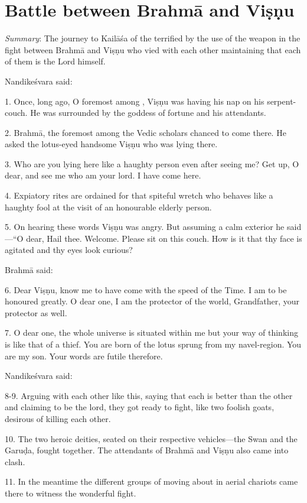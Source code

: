 \chapter{Battle between Brahmā and Viṣṇu}

\emph{Summary}: The journey to Kailāśa of the  terrified by the use of
the  weapon in the fight between Brahmā and Viṣṇu who vied with
each other maintaining that each of them is the Lord himself.

Nandikeśvara said:

1. Once, long ago, O foremost among , Viṣṇu was having his nap on his
serpent-couch. He was surrounded by the goddess of fortune and his attendants.

2. Brahmā, the foremost among the Vedic scholars chanced to come there. He asked
the lotus-eyed handsome Viṣṇu who was lying there.

3. Who are you lying here like a haughty person even after seeing me? Get up,
O dear, and see me who am your lord. I have come here.

4. Expiatory rites are ordained for that spiteful wretch who behaves like a
haughty fool at the visit of an honourable elderly person.

5. On hearing these words Viṣṇu was angry. But assuming a calm exterior he said
—“O dear, Hail thee. Welcome. Please sit on this couch. How is it that thy face
is agitated and thy eyes look curious?

Brahmā said:

6. Dear Viṣṇu, know me to have come with the speed of the Time. I am to be
honoured greatly. O dear one, I am the protector of the world, Grandfather,
your protector as well.

7. O dear one, the whole universe is situated within me but your way of thinking
is like that of a thief. You are born of the lotus sprung from my navel-region.
You are my son. Your words are futile therefore.

Nandikeśvara said:

8-9. Arguing with each other like this, saying that each is better than
the other and claiming to be the lord, they got ready to fight, like two foolish
goats, desirous of killing each other.

10. The two heroic deities, seated on their respective vehicles—the Swan and
the Garuḍa, fought together. The attendants of Brahmā and Viṣṇu also came into
clash.

11. In the meantime the different groups of  moving about in aerial
chariots came there to witness the wonderful fight.

